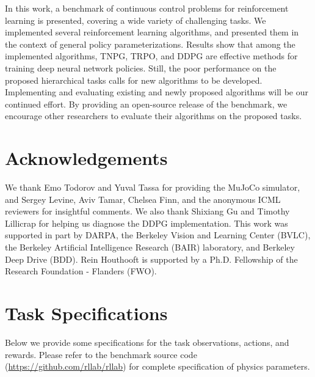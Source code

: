 \documentclass{article}
\begin{document}
In this work, a benchmark of continuous control problems for reinforcement learning is presented, covering a wide variety of challenging tasks. We implemented several reinforcement learning algorithms, and presented them in the context of general policy parameterizations. Results show that among the implemented algorithms, TNPG, TRPO, and DDPG are effective methods for training deep neural network policies. Still, the poor performance on the proposed hierarchical tasks calls for new algorithms to be developed. Implementing and evaluating existing and newly proposed algorithms will be our continued effort. By providing an open-source release of the benchmark, we encourage other researchers to evaluate their algorithms on the proposed tasks.

\section*{Acknowledgements}

We thank Emo Todorov and Yuval Tassa for providing the MuJoCo simulator, and Sergey Levine, Aviv Tamar, Chelsea Finn, and the anonymous ICML reviewers for insightful comments. We also thank Shixiang Gu and Timothy Lillicrap for helping us diagnose the DDPG implementation. This work was supported in part by DARPA, the Berkeley Vision and
Learning Center (BVLC), the Berkeley Artificial Intelligence Research
(BAIR) laboratory, and Berkeley Deep Drive (BDD). Rein Houthooft is supported by a Ph.D. Fellowship of the Research Foundation - Flanders (FWO).








\setlength{\bibsep}{4.0pt}
\small



\normalsize
\clearpage{}\renewcommand*{\UrlFont}{\normalsize}

\onecolumn

\setcounter{section}{0}

\section{Task Specifications}

Below we provide some specifications for the task observations, actions, and rewards. Please refer to the benchmark source code (\url{https://github.com/rllab/rllab}) for complete specification of physics parameters.
\end{document}
